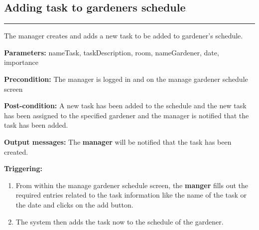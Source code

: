 
\label{chap:software-operations_Manager}

\subsection{Adding task to gardeners schedule}

\hrule
\hfill
\vspace{0.5cm}
\label{operation:addTaskGardener}

The manager creates and adds a new task to be added to gardener's schedule.
\begin{description}

\item \textbf{Parameters:} nameTask, taskDescription, room, nameGardener, date,
importance
\item \textbf{Precondition:} The manager is logged in and on the manage gardener
schedule screen
\item \textbf{Post-condition:} A new task has been added to the schedule and the
new task has been assigned to the specified gardener and the manager is
notified that the task has been added.
\item \textbf{Output messages:} The \textbf{manager} will be notified that the
task has been created.

\item \textbf{Triggering:}
\begin{enumerate}
\item From within the manage gardener schedule screen, the \textbf{manger} fills
out the required entries related to the task information like the name of the task or
the date and clicks on the add button.
\item The system then adds the task now to the schedule of the gardener.
\end{enumerate}
\end{description}
